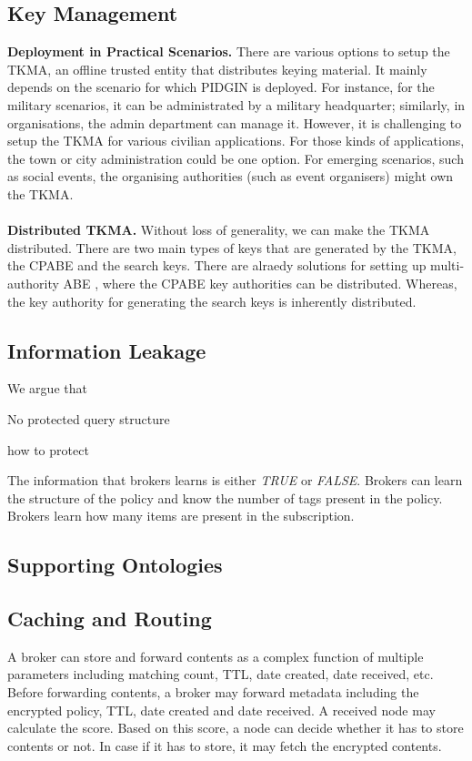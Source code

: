 \documentclass[epsfig,a4paper,11pt,titlepage]{book}
\numberwithin{algorithm}{chapter}
\begin{document}
\subsection{Key Management}

\noindent \textbf{Deployment in Practical Scenarios.}
There are various options to setup the \gls{TKMA}, an offline trusted entity that distributes keying material. It mainly depends on the scenario for which \gls{PIDGIN} is deployed. For instance, for the military scenarios, it can be administrated by a military headquarter; similarly, in organisations, the admin department can manage it. However, it is challenging to setup the \gls{TKMA} for various civilian applications. For those kinds of applications, the town or city administration could be one option. For emerging scenarios, such as social events, the organising authorities (such as event organisers) might own the \gls{TKMA}. \\ \\
\noindent \textbf{Distributed \gls{TKMA}.} 
Without loss of generality, we can make the \gls{TKMA} distributed. There are two main types of keys that are generated by the \gls{TKMA}, the \gls{CPABE} and the search keys. There are alraedy solutions for setting up multi-authority \gls{ABE} \cite{Chase:2009, Chase:2007}, where the \gls{CPABE} key authorities can be distributed. Whereas, the key authority for generating the search keys is inherently distributed.


\iffalse
\subsection{Information Leakage}

We argue that 

No protected query structure

how to protect



The information that brokers learns is either \emph{TRUE} or \emph{FALSE}.
Brokers can learn the structure of the policy and know the number of tags present in the policy. 
Brokers learn how many items are present in the subscription.


\subsection{Supporting Ontologies}

\subsection{Caching and Routing}
A broker can store and forward contents as a complex function of multiple parameters including matching count, \gls{TTL}, date created, date received, etc. Before forwarding contents, a broker may forward metadata including the encrypted policy, \gls{TTL}, date created and date received. A received node may calculate the score. Based on this score, a node can decide whether it has to store contents or not. In case if it has to store, it may fetch the encrypted contents.
\end{document}
